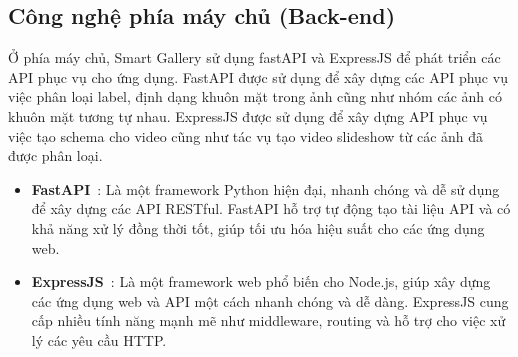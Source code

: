 \subsection{Công nghệ phía máy chủ (Back-end)}

Ở phía máy chủ, Smart Gallery sử dụng fastAPI và ExpressJS để phát triển các API phục vụ cho ứng dụng. FastAPI được sử dụng để xây dựng các API phục vụ việc phân loại label, định dạng khuôn mặt trong ảnh cũng như nhóm các ảnh có khuôn mặt tương tự nhau. ExpressJS được sử dụng để xây dựng API phục vụ việc tạo schema cho video cũng như tác vụ tạo video slideshow từ các ảnh đã được phân loại.
\begin{itemize}
    \item \textbf{FastAPI}~\cite{fastapidoc}: Là một framework Python hiện đại, nhanh chóng và dễ sử dụng để xây dựng các API RESTful. FastAPI hỗ trợ tự động tạo tài liệu API và có khả năng xử lý đồng thời tốt, giúp tối ưu hóa hiệu suất cho các ứng dụng web.
    
    \item \textbf{ExpressJS}~\cite{expressjsdoc}: Là một framework web phổ biến cho Node.js, giúp xây dựng các ứng dụng web và API một cách nhanh chóng và dễ dàng. ExpressJS cung cấp nhiều tính năng mạnh mẽ như middleware, routing và hỗ trợ cho việc xử lý các yêu cầu HTTP.
\end{itemize}